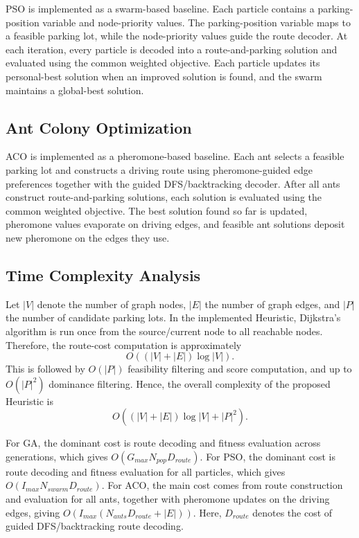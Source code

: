 PSO is implemented as a swarm-based baseline. Each particle contains a parking-position variable and node-priority values. The parking-position variable maps to a feasible parking lot, while the node-priority values guide the route decoder. At each iteration, every particle is decoded into a route-and-parking solution and evaluated using the common weighted objective. Each particle updates its personal-best solution when an improved solution is found, and the swarm maintains a global-best solution.

\subsection{Ant Colony Optimization}

ACO is implemented as a pheromone-based baseline. Each ant selects a feasible parking lot and constructs a driving route using pheromone-guided edge preferences together with the guided DFS/backtracking decoder. After all ants construct route-and-parking solutions, each solution is evaluated using the common weighted objective. The best solution found so far is updated, pheromone values evaporate on driving edges, and feasible ant solutions deposit new pheromone on the edges they use.

\subsection{Time Complexity Analysis}

Let \(|V|\) denote the number of graph nodes, \(|E|\) the number of graph edges, and \(|P|\) the number of candidate parking lots. In the implemented Heuristic, Dijkstra's algorithm is run once from the source/current node to all reachable nodes. Therefore, the route-cost computation is approximately
\[
O((|V|+|E|)\log |V|).
\]
This is followed by \(O(|P|)\) feasibility filtering and score computation, and up to \(O(|P|^2)\) dominance filtering. Hence, the overall complexity of the proposed Heuristic is
\[
O((|V|+|E|)\log |V| + |P|^2).
\]

For GA, the dominant cost is route decoding and fitness evaluation across generations, which gives \(O(G_{max}N_{pop}D_{route})\). For PSO, the dominant cost is route decoding and fitness evaluation for all particles, which gives \(O(I_{max}N_{swarm}D_{route})\). For ACO, the main cost comes from route construction and evaluation for all ants, together with pheromone updates on the driving edges, giving \(O(I_{max}(N_{ants}D_{route}+|E|))\). Here, \(D_{route}\) denotes the cost of guided DFS/backtracking route decoding.
